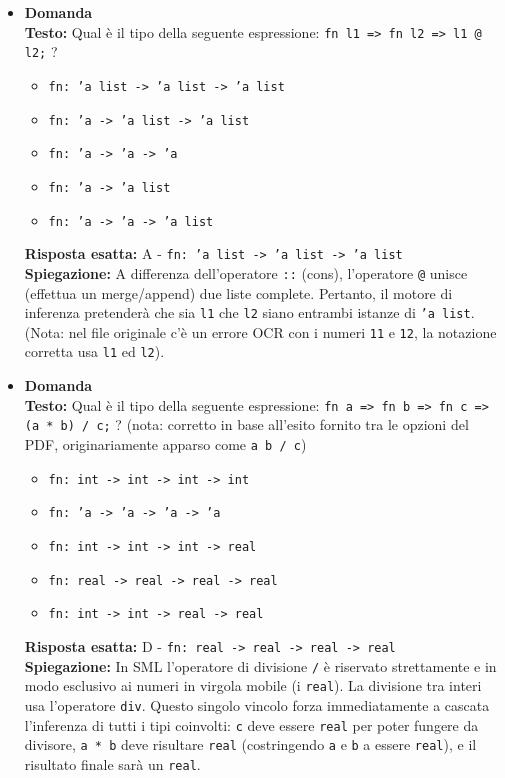 \documentclass[12pt, a4paper]{article}
\newcounter{domandateoria}
\begin{document}
\begin{itemize}
    \item {}\textbf{Domanda \thedomandateoria} \\
    \textbf{Testo:} Qual è il tipo della seguente espressione: \texttt{fn l1 => fn l2 => l1 @ l2;} ?
    \begin{itemize}
        \item[A)] \texttt{fn: 'a list -> 'a list -> 'a list}
        \item[B)] \texttt{fn: 'a -> 'a list -> 'a list}
        \item[C)] \texttt{fn: 'a -> 'a -> 'a}
        \item[D)] \texttt{fn: 'a -> 'a list}
        \item[E)] \texttt{fn: 'a -> 'a -> 'a list}
    \end{itemize}
    \textbf{Risposta esatta:} A - \texttt{fn: 'a list -> 'a list -> 'a list} \\
    \textbf{Spiegazione:} A differenza dell'operatore \texttt{::} (cons), l'operatore \texttt{@} unisce (effettua un merge/append) due liste complete. Pertanto, il motore di inferenza pretenderà che sia \texttt{l1} che \texttt{l2} siano entrambi istanze di \texttt{'a list}. (Nota: nel file originale c'è un errore OCR con i numeri \texttt{11} e \texttt{12}, la notazione corretta usa \texttt{l1} ed \texttt{l2}).
    \vspace{0.3cm}

    \item {}\textbf{Domanda \thedomandateoria} \\
    \textbf{Testo:} Qual è il tipo della seguente espressione: \texttt{fn a => fn b => fn c => (a * b) / c;} ? (nota: corretto in base all'esito fornito tra le opzioni del PDF, originariamente apparso come \texttt{a b / c})
    \begin{itemize}
        \item[A)] \texttt{fn: int -> int -> int -> int}
        \item[B)] \texttt{fn: 'a -> 'a -> 'a -> 'a}
        \item[C)] \texttt{fn: int -> int -> int -> real}
        \item[D)] \texttt{fn: real -> real -> real -> real}
        \item[E)] \texttt{fn: int -> int -> real -> real}
    \end{itemize}
    \textbf{Risposta esatta:} D - \texttt{fn: real -> real -> real -> real} \\
    \textbf{Spiegazione:} In SML l'operatore di divisione \texttt{/} è riservato strettamente e in modo esclusivo ai numeri in virgola mobile (i \texttt{real}). La divisione tra interi usa l'operatore \texttt{div}. Questo singolo vincolo forza immediatamente a cascata l'inferenza di tutti i tipi coinvolti: \texttt{c} deve essere \texttt{real} per poter fungere da divisore, \texttt{a * b} deve risultare \texttt{real} (costringendo \texttt{a} e \texttt{b} a essere \texttt{real}), e il risultato finale sarà un \texttt{real}.
    \vspace{0.3cm}


\end{itemize}
\end{document}
